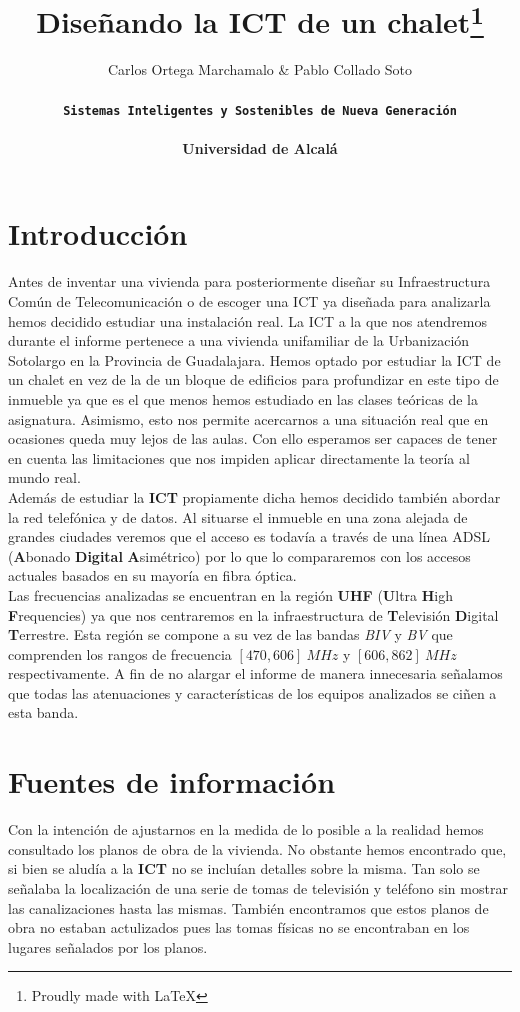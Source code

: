 \documentclass{article}[12 pt]
\title{Diseñando la ICT de un chalet\thanks{Proudly made with \LaTeX}}
\author{Carlos Ortega Marchamalo \& Pablo Collado Soto \\ \\ \textbf{\texttt{Sistemas Inteligentes y Sostenibles de Nueva Generación}} \\ \\ \textbf{Universidad de Alcalá}}
\date{}
\begin{document}
	\maketitle

	\newpage

	\tableofcontents

	\newpage

	\section{Introducción}
		Antes de inventar una vivienda para posteriormente diseñar su Infraestructura Común de Telecomunicación o de escoger una ICT ya diseñada para analizarla hemos decidido estudiar una instalación real. La ICT a la que nos atendremos durante el informe pertenece a una vivienda unifamiliar de la Urbanización Sotolargo en la Provincia de Guadalajara. Hemos optado por estudiar la ICT de un chalet en vez de la de un bloque de edificios para profundizar en este tipo de inmueble ya que es el que menos hemos estudiado en las clases teóricas de la asignatura. Asimismo, esto nos permite acercarnos a una situación real que en ocasiones queda muy lejos de las aulas. Con ello esperamos ser capaces de tener en cuenta las limitaciones que nos impiden aplicar directamente la teoría al mundo real.\\

		Además de estudiar la \textbf{ICT} propiamente dicha hemos decidido también abordar la red telefónica y de datos. Al situarse el inmueble en una zona alejada de grandes ciudades veremos que el acceso es todavía a través de una línea ADSL (\textbf{A}bonado \textbf{Digital} \textbf{A}simétrico) por lo que lo compararemos con los accesos actuales basados en su mayoría en fibra óptica.\\

		Las frecuencias analizadas se encuentran en la región \textbf{UHF} (\textbf{U}ltra \textbf{H}igh \textbf{F}requencies) ya que nos centraremos en la infraestructura de \textbf{T}elevisión \textbf{D}igital \textbf{T}errestre. Esta región se compone a su vez de las bandas \textit{BIV} y \textit{BV} que comprenden los rangos de frecuencia $[470, 606]\ MHz$ y $[606, 862]\ MHz$ respectivamente. A fin de no alargar el informe de manera innecesaria señalamos que todas las atenuaciones y características de los equipos analizados se ciñen a esta banda.\\

	\section{Fuentes de información}
		Con la intención de ajustarnos en la medida de lo posible a la realidad hemos consultado los planos de obra de la vivienda. No obstante hemos encontrado que, si bien se aludía a la \textbf{ICT} no se incluían detalles sobre la misma. Tan solo se señalaba la localización de una serie de tomas de televisión y teléfono sin mostrar las canalizaciones hasta las mismas. También encontramos que estos planos de obra no estaban actulizados pues las tomas físicas no se encontraban en los lugares señalados por los planos.\\
\end{document}

